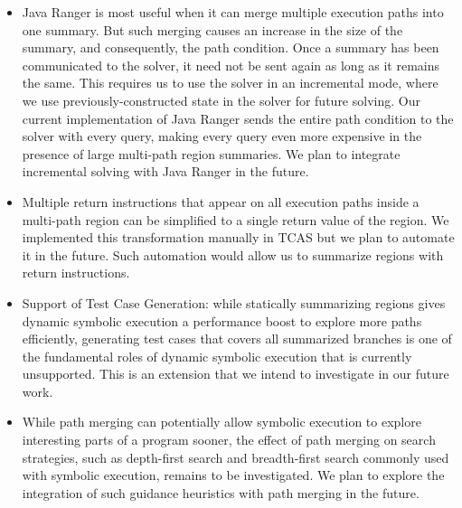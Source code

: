 \begin{itemize}
\item Java Ranger is most useful when it can merge multiple execution paths into one summary. But such merging causes an
increase in the size of the summary, and consequently, the path condition.
%
Once a summary has been communicated to the solver, it need not be sent again as long as it remains the same.
%
This requires us to use the solver in an incremental mode, where we use previously-constructed state in the solver for
future solving.
%
Our current implementation of Java Ranger sends the entire path condition to the solver with every query, making every
query even more expensive in the presence of large multi-path region summaries.
%
We plan to integrate incremental solving with Java Ranger in the future.
%
\item Multiple return instructions that appear on all execution paths inside a multi-path region can be simplified to a
single return value of the region.
%
We implemented this transformation manually in TCAS but we plan to automate it in the future.
%
Such automation would allow us to summarize regions with return instructions.
%
\item Support of Test Case Generation: while statically summarizing regions gives dynamic symbolic execution a
performance boost to explore more paths efficiently, generating test cases that covers all summarized branches is one of
the fundamental roles of dynamic symbolic execution that is currently unsupported.
%
This is an extension that we intend to investigate in our future work.
%
\item While path merging can potentially allow symbolic execution to explore interesting parts of a program sooner, the
effect of path merging on search strategies, such as depth-first search and breadth-first search commonly used with
symbolic execution, remains to be investigated.
%
We plan to explore the integration of such guidance heuristics with path merging in the future.
\end{itemize}